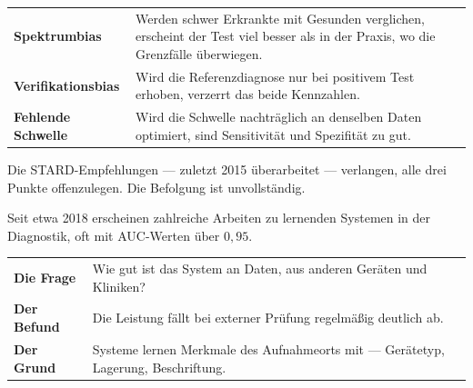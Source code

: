 \begin{forschung}
\begin{center}
{\small
\renewcommand{\arraystretch}{1.45}
\begin{tabular}{@{}P{2.8cm}P{5.4cm}@{}}
\toprule
\textbf{Spektrumbias} & Werden schwer Erkrankte mit Gesunden verglichen, erscheint der Test viel besser als in der Praxis, wo die Grenzfälle überwiegen.\\
\textbf{Verifikationsbias} & Wird die Referenzdiagnose nur bei positivem Test erhoben, verzerrt das beide Kennzahlen.\\
\textbf{Fehlende Schwelle} & Wird die Schwelle nachträglich an denselben Daten optimiert, sind Sensitivität und Spezifität zu gut.\\
\bottomrule
\end{tabular}}
\end{center}

Die STARD-Empfehlungen --- zuletzt 2015 überarbeitet --- verlangen, alle drei Punkte offenzulegen. Die Befolgung ist unvollständig.

Seit etwa 2018 erscheinen zahlreiche Arbeiten zu lernenden Systemen in der Diagnostik, oft mit AUC-Werten über $0{,}95$.

\begin{center}
{\small
\renewcommand{\arraystretch}{1.45}
\begin{tabular}{@{}P{2.6cm}P{5.6cm}@{}}
\toprule
\textbf{Die Frage} & Wie gut ist das System an  Daten, aus anderen Geräten und Kliniken?\\
\textbf{Der Befund} & Die Leistung fällt bei externer Prüfung regelmäßig deutlich ab.\\
\textbf{Der Grund} & Systeme lernen Merkmale des Aufnahmeorts mit --- Gerätetyp, Lagerung, Beschriftung.\\
\bottomrule
\end{tabular}}
\end{center}

\begin{center}
\begin{minipage}{0.88\textwidth}
\end{minipage}
\end{center}
\end{forschung}

